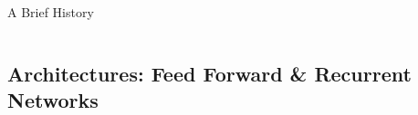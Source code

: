 \documentclass{beamer}
\begin{document}
\begin{frame}[t]{A Brief History}
\begin{columns}[t]
    \end{columns}
\end{frame}

\subsection{Architectures: Feed Forward \& Recurrent Networks}
\end{document}
